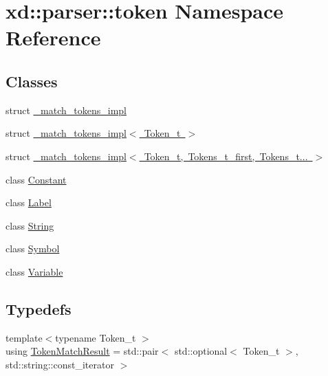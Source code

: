 \hypertarget{namespacexd_1_1parser_1_1token}{}\section{xd\+:\+:parser\+:\+:token Namespace Reference}
\label{namespacexd_1_1parser_1_1token}
\subsection*{Classes}
\begin{DoxyCompactItemize}
\item 
struct \mbox{\hyperlink{structxd_1_1parser_1_1token_1_1__match__tokens__impl}{\+\_\+match\+\_\+tokens\+\_\+impl}}
\item 
struct \mbox{\hyperlink{structxd_1_1parser_1_1token_1_1__match__tokens__impl_3_01_token__t_01_4}{\+\_\+match\+\_\+tokens\+\_\+impl$<$ Token\+\_\+t $>$}}
\item 
struct \mbox{\hyperlink{structxd_1_1parser_1_1token_1_1__match__tokens__impl_3_01_token__t_00_01_tokens__t__first_00_01_tokens__t_8_8_8_01_4}{\+\_\+match\+\_\+tokens\+\_\+impl$<$ Token\+\_\+t, Tokens\+\_\+t\+\_\+first, Tokens\+\_\+t... $>$}}
\item 
class \mbox{\hyperlink{classxd_1_1parser_1_1token_1_1_constant}{Constant}}
\item 
class \mbox{\hyperlink{classxd_1_1parser_1_1token_1_1_label}{Label}}
\item 
class \mbox{\hyperlink{classxd_1_1parser_1_1token_1_1_string}{String}}
\item 
class \mbox{\hyperlink{classxd_1_1parser_1_1token_1_1_symbol}{Symbol}}
\item 
class \mbox{\hyperlink{classxd_1_1parser_1_1token_1_1_variable}{Variable}}
\end{DoxyCompactItemize}
\subsection*{Typedefs}
\begin{DoxyCompactItemize}
\item 
{\footnotesize template$<$typename Token\+\_\+t $>$ }\\using \mbox{\hyperlink{namespacexd_1_1parser_1_1token_a766c52bbfb7cb1f08498ef0bb9ec756e}{Token\+Match\+Result}} = std\+::pair$<$ std\+::optional$<$ Token\+\_\+t $>$, std\+::string\+::const\+\_\+iterator $>$
\end{DoxyCompactItemize}
